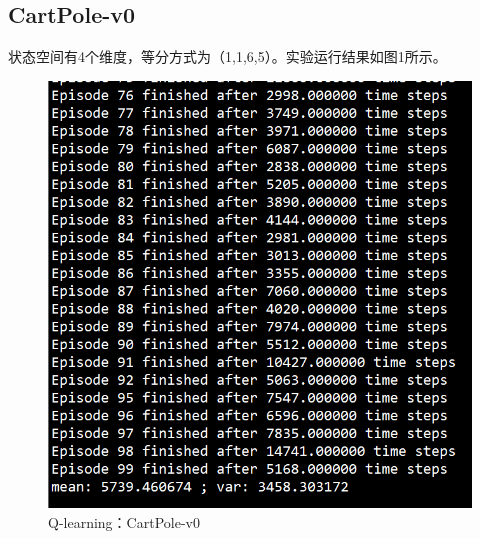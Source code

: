 \documentclass[a4paper,UTF8]{article}
\theoremstyle{definition}
\begin{document}
\subsection{CartPole-v0}
    状态空间有4个维度，等分方式为（1,1,6,5）。实验运行结果如图1所示。
    \begin{center}
    \begin{figure}[H]
          \centering
          \includegraphics[width=12cm]{1.png}
          \caption{Q-learning：CartPole-v0}
          \label{fig:2.3}
    \end{figure}
    \end{center}
\end{document}
